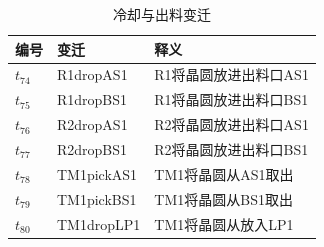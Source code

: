 \begin{table}[H]
	\centering
	\caption{冷却与出料变迁}
	\begin{tabular}{lll}
		\toprule
		编号 & 变迁       & 释义                  \\
		\hline
		$t_{74}$  & R1dropAS1  & R1将晶圆放进出料口AS1 \\
		$t_{75}$  & R1dropBS1  & R1将晶圆放进出料口BS1 \\
		$t_{76}$  & R2dropAS1  & R2将晶圆放进出料口AS1 \\
		$t_{77}$  & R2dropBS1  & R2将晶圆放进出料口BS1 \\
		$t_{78}$  & TM1pickAS1 & TM1将晶圆从AS1取出    \\
		$t_{79}$  & TM1pickBS1 & TM1将晶圆从BS1取出    \\
		$t_{80}$  & TM1dropLP1 & TM1将晶圆从放入LP1    \\
		\bottomrule
	\end{tabular}
\end{table}

